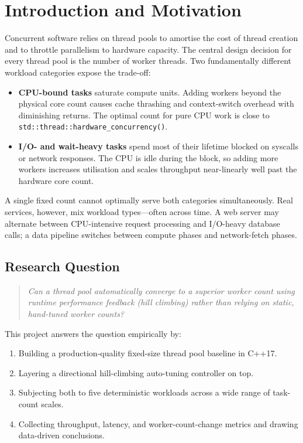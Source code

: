 \documentclass[12pt,a4paper]{article}
\begin{document}
\tableofcontents
\newpage

\section{Introduction and Motivation}

Concurrent software relies on thread pools to amortise the cost of thread
creation and to throttle parallelism to hardware capacity.
The central design decision for every thread pool is the number of worker
threads.
Two fundamentally different workload categories expose the trade-off:

\begin{itemize}
  \item \textbf{CPU-bound tasks} saturate compute units.
        Adding workers beyond the physical core count causes cache thrashing
        and context-switch overhead with diminishing returns.
        The optimal count for pure CPU work is close to
        \texttt{std::thread::hardware\_concurrency()}.
  \item \textbf{I/O- and wait-heavy tasks} spend most of their lifetime
        blocked on syscalls or network responses.
        The CPU is idle during the block, so adding more workers increases
        utilisation and scales throughput near-linearly well past the hardware
        core count.
\end{itemize}

A single fixed count cannot optimally serve both categories simultaneously.
Real services, however, mix workload types---often across time.
A web server may alternate between CPU-intensive request processing and
I/O-heavy database calls; a data pipeline switches between compute phases
and network-fetch phases.

\subsection{Research Question}

\begin{quote}
\itshape
Can a thread pool automatically converge to a superior worker count using
runtime performance feedback (hill climbing) rather than relying on static,
hand-tuned worker counts?
\end{quote}

This project answers the question empirically by:
\begin{enumerate}
  \item Building a production-quality fixed-size thread pool baseline in C++17.
  \item Layering a directional hill-climbing auto-tuning controller on top.
  \item Subjecting both to five deterministic workloads across a wide range
        of task-count scales.
  \item Collecting throughput, latency, and worker-count-change metrics and
        drawing data-driven conclusions.
\end{enumerate}
\end{document}
